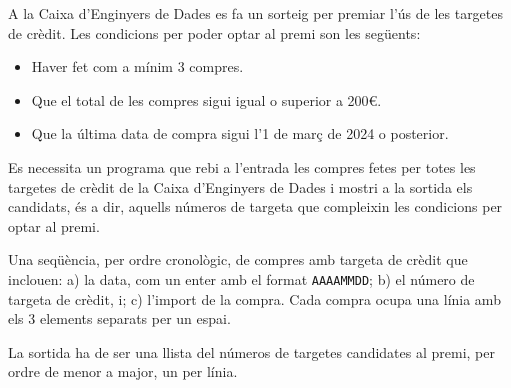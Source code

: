 
\Statement

A la Caixa d'Enginyers de Dades es fa un sorteig per premiar l'ús de les targetes de crèdit. Les condicions per poder optar al premi son les següents:
\begin{itemize}
    \item Haver fet com a mínim 3 compres.
    \item Que el total de les compres sigui igual o superior a 200€.
    \item Que la última data de compra sigui l'1 de març de 2024 o posterior.
\end{itemize}

\medskip

Es necessita un programa que rebi a l'entrada les compres fetes per totes les targetes de crèdit de la Caixa d'Enginyers de Dades i mostri a la sortida els candidats, és a dir, aquells números de targeta que compleixin les condicions per optar al premi.

\Input

Una seqüència, per ordre cronològic, de compres amb targeta de crèdit que inclouen: a) la data, com un enter amb el format \verb|AAAAMMDD|; b) el número de targeta de crèdit, i; c) l'import de la compra. Cada compra ocupa una línia amb els 3 elements separats per un espai.

\Output

La sortida ha de ser una llista del números de targetes candidates al premi, per ordre de menor a major, un per línia.

\Sample

